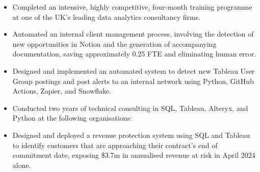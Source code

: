 \documentclass[10pt,a4paper,ragged2e,withhyper]{altacv}
\begin{document}

\makecvname



\begin{paracol}{2}

\begin{itemize}
\item Completed an intensive, highly competitive, four-month training programme at one of the UK’s leading data analytics consultancy firms.
\item Automated an internal client management process, involving the detection of new opportunities in Notion and the generation of accompanying documentation, saving approximately 0.25 FTE and eliminating human error.
\item Designed and implemented an automated system to detect new Tableau User Group postings and post alerts to an internal network using Python, GitHub Actions, Zapier, and Snowflake.
\item Conducted two years of technical consulting in SQL, Tableau, Alteryx, and Python at the following organisations:

\medskip
{}

\end{itemize}

\divider

\begin{itemize}
\item Designed and deployed a revenue protection system using SQL and Tableau to identify customers that are approaching their contract's end of commitment date, exposing \$3.7m in annualised revenue at risk in April 2024 alone.


\end{itemize}
\end{paracol}
\end{document}
